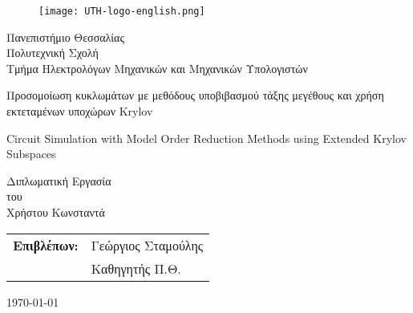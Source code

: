 ﻿\begin{titlepage}

\begin{figure}[H]
  \begin{center}
    \texttt{[image: UTH-logo-english.png]}
    \label{fig:cover_auth_logo}
  \end{center}
\end{figure}

\centering
\Large Πανεπιστήμιο Θεσσαλίας\\
\Large Πολυτεχνική Σχολή\\
\large Τμήμα Ηλεκτρολόγων Μηχανικών και Μηχανικών Υπολογιστών\\

\vspace{\fill}

\LARGE Προσομοίωση κυκλωμάτων με μεθόδους 
υποβιβασμού τάξης μεγέθους και χρήση εκτεταμένων υποχώρων 
Krylov

\vspace{\fill}

\LARGE Circuit Simulation with Model Order Reduction Methods using Extended 
Krylov Subspaces

\vspace{\fill}

\Large Διπλωματική Εργασία\\
\Large του\\
\Large Χρήστου Κωνσταντά

\vspace{\fill}
\raggedright

\begin{tabular}{ll}
\textbf{Επιβλέπων:} & Γεώργιος Σταμούλης\\
 & Καθηγητής Π.Θ.\\
\end{tabular}

\centering
\vspace{\fill}
\today

\end{titlepage}

